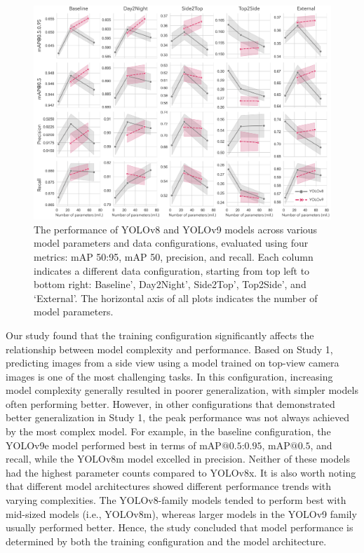 \begin{figure}[h]
\centering
\includegraphics[width=1\textwidth]{figure_4.jpg}
\caption{The performance of YOLOv8 and YOLOv9 models across various model parameters and data configurations, evaluated using four metrics: mAP 50:95, mAP 50, precision, and recall. Each column indicates a different data configuration, starting from top left to bottom right: Baseline', Day2Night', Side2Top', Top2Side', and `External'. The horizontal axis of all plots indicates the number of model parameters.}
\label{fig:models}
\end{figure}



Our study found that the training configuration significantly affects the relationship between model complexity and performance. Based on Study 1, predicting images from a side view using a model trained on top-view camera images is one of the most challenging tasks. In this configuration, increasing model complexity generally resulted in poorer generalization, with simpler models often performing better. However, in other configurations that demonstrated better generalization in Study 1, the peak performance was not always achieved by the most complex model. For example, in the baseline configuration, the YOLOv9e model performed best in terms of $\text{mAP@{0.5:0.95}}$, $\text{mAP@{0.5}}$, and recall, while the YOLOv8m model excelled in precision. Neither of these models had the highest parameter counts compared to YOLOv8x. It is also worth noting that different model architectures showed different performance trends with varying complexities. The YOLOv8-family models tended to perform best with mid-sized models (i.e., YOLOv8m), whereas larger models in the YOLOv9 family usually performed better. Hence, the study concluded that model performance is determined by both the training configuration and the model architecture.


